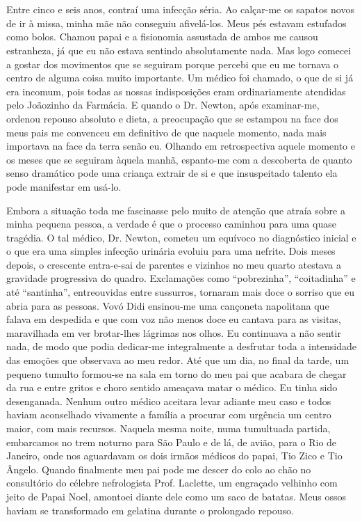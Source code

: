 \chapter{}
Entre cinco e seis anos, contraí uma infecção séria. Ao calçar-me os sapatos novos de ir à missa, minha mãe não conseguiu afivelá-los.
Meus pés estavam estufados como bolos.
Chamou papai e a fisionomia assustada de ambos me causou estranheza, já que eu não estava sentindo absolutamente nada.
Mas logo comecei a gostar dos movimentos que se seguiram porque percebi que eu me tornava o centro de alguma coisa muito importante.
Um médico foi chamado, o que de si já era incomum, pois todas as nossas indisposições eram ordinariamente atendidas pelo Joãozinho da Farmácia.
E quando o Dr. Newton, após examinar-me, ordenou repouso absoluto e dieta, a preocupação que se estampou na face dos meus pais me convenceu em definitivo de que naquele momento, nada mais importava na face da terra senão eu.
Olhando em retrospectiva aquele momento e os meses que se seguiram àquela manhã, espanto-me com a descoberta de quanto senso dramático pode uma criança extrair de si e que insuspeitado talento ela pode manifestar em usá-lo.

Embora a situação toda me fascinasse pelo muito de atenção que atraía sobre a minha pequena pessoa, a verdade é que o processo caminhou para uma quase tragédia.
O tal médico, Dr. Newton, cometeu um equívoco no diagnóstico inicial e o que era uma simples infecção urinária evoluiu para uma nefrite.
Dois meses depois, o crescente entra-e-sai de parentes e vizinhos no meu quarto atestava a gravidade progressiva do quadro. Exclamações como ``pobrezinha'', ``coitadinha'' e até ``santinha'', entreouvidas entre sussurros, tornaram mais doce o sorriso que eu abria para as pessoas.
Vovó Didi ensinou-me uma cançoneta napolitana que falava em despedida e que com voz não menos doce eu cantava para as visitas, maravilhada em ver brotar-lhes lágrimas nos olhos.
Eu continuava a não sentir nada, de modo que podia dedicar-me integralmente a desfrutar toda a intensidade das emoções que observava ao meu redor.
Até que um dia, no final da tarde, um pequeno tumulto formou-se na sala em torno do meu pai que acabara de chegar da rua e entre gritos e choro sentido ameaçava matar o médico.
Eu tinha sido desenganada.
Nenhum outro médico aceitara levar adiante meu caso e todos haviam aconselhado vivamente a família a procurar com urgência um centro maior, com mais recursos.  Naquela mesma noite, numa tumultuada partida, embarcamos no trem noturno para São Paulo e de lá, de avião, para o Rio de Janeiro, onde nos aguardavam os dois irmãos médicos do papai, Tio Zico e Tio Ângelo.
Quando finalmente meu pai pode me descer do colo ao chão no consultório do célebre nefrologista Prof. Laclette, um engraçado velhinho com jeito de Papai Noel, amontoei diante dele como um saco de batatas.
Meus ossos haviam se transformado em gelatina durante o prolongado repouso.

